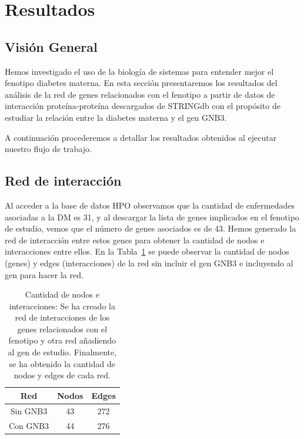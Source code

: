 
\section{Resultados}

\subsection{Visión General}

Hemos investigado el uso de la biología de sistemas para entender mejor el fenotipo diabetes materna. En esta sección presentaremos los resultados del análisis de la red de genes relacionados con el fenotipo a partir de datos de interacción proteína-proteína descargados de STRINGdb con el propósito de estudiar la relación entre la diabetes materna y el gen GNB3.

A continuación procederemos a detallar los resultados obtenidos al ejecutar nuestro flujo de trabajo.

\subsection{Red de interacción}

Al acceder a la base de datos HPO observamos que la cantidad de enfermedades asociadas a la DM es 31, y al descargar la lista de genes implicados en el fenotipo de estudio, vemos que el número de genes asociados es de 43. Hemos generado la red de interacción entre estos genes para obtener la cantidad de nodos e interacciones entre ellos. En la Tabla~\ref{table:nodes_edges_count} se puede observar la cantidad de nodos (genes) y edges (interacciones) de la red sin incluir el gen GNB3 e incluyendo al gen para hacer la red.


\begin{table}[h]
	\centering
	\caption{Cantidad de nodos e interacciones: Se ha creado la red de interacciones de los genes relacionados con el fenotipo y otra red añadiendo al gen de estudio. Finalmente, se ha obtenido la cantidad de nodos y edges de cada red.}
	\label{table:nodes_edges_count}
	\begin{tabular}{|c|c|c|}
		\hline
		\textbf{Red} & \textbf{Nodos} & \textbf{Edges} \\ \hline
		Sin GNB3 & 43    & 272   \\ \hline
		Con GNB3 & 44    & 276  \\ \hline
	\end{tabular}

\end{table}

